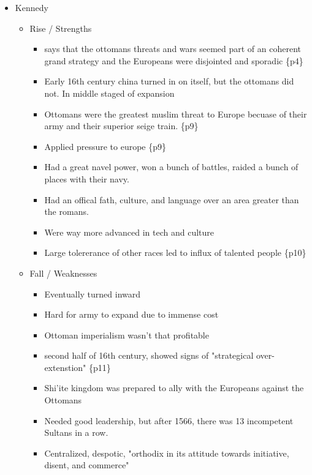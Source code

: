 \documentclass[letterpaper]{article}
\begin{document}
\begin{itemize}
\item Kennedy

\begin{itemize}
\item Rise / Strengths

\begin{itemize}
\item says that the ottomans threats and wars seemed part of an coherent
grand strategy and the Europeans were disjointed and sporadic \{p4\}
\item Early 16th century china turned in on itself, but the ottomans did
not. In middle staged of expansion
\item Ottomans were the greatest muslim threat to Europe becuase of
their army and their superior seige train. \{p9\}
\item Applied pressure to europe \{p9\}
\item Had a great navel power, won a bunch of battles, raided a bunch of
places with their navy.
\item Had an offical fath, culture, and language over an area greater
than the romans.
\item Were way more advanced in tech and culture
\item Large tolererance of other races led to influx of talented people
\{p10\}
\end{itemize}

\item Fall / Weaknesses

\begin{itemize}
\item Eventually turned inward

\item Hard for army to expand due to immense cost

\item Ottoman imperialism wasn't that profitable

\item second half of 16th century, showed signs of "strategical
over-extenstion" \{p11\}

\item Shi'ite kingdom was prepared to ally with the Europeans against
the Ottomans

\item Needed good leadership, but after 1566, there was 13 incompetent
Sultans in a row.

\item Centralized, despotic, "orthodix in its attitude towards
initiative, disent, and commerce"


\end{itemize}
\end{itemize}
\end{itemize}
\end{document}
